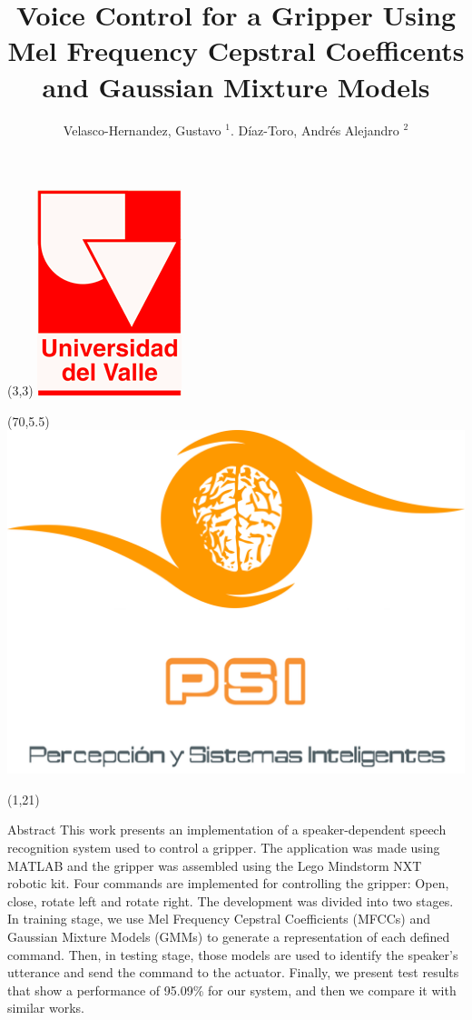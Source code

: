 \documentclass[final]{beamer}
\title{Voice Control for a Gripper Using Mel Frequency Cepstral Coefficents and Gaussian Mixture Models}
\author{Velasco-Hernandez, Gustavo $^{1}$. D\'{i}az-Toro, Andr\'{e}s Alejandro $^{2}$}
\institute{Perception and Intelligent Systems Research Group\\
	School of Electric and Electronics Engineering\\
	Universidad del Valle}
\date{}
\begin{document}
\begin{frame}{}

\begin{textblock}{5}(3,3)
\includegraphics[width=0.10\paperwidth]{figs/univalle.png}
\end{textblock}
\begin{textblock}{5}(70,5.5)
\includegraphics[width=0.15\paperwidth]{figs/psilogo3.png}
\end{textblock}


\begin{textblock}{39.5}(1,21)
\begin{block}{Abstract}
This work presents an implementation of a speaker-dependent speech recognition system used to control a gripper. The application was made using MATLAB and the gripper was assembled using the Lego Mindstorm NXT robotic kit. Four commands are implemented for controlling the gripper: Open, close, rotate left and rotate right. The development was divided into two stages. In training stage, we use Mel Frequency Cepstral Coefficients (MFCCs) and Gaussian Mixture Models (GMMs) to generate a representation of each defined command. Then, in testing stage, those models are used to identify the speaker’s utterance and send the command to the actuator. Finally, we present test results that show a performance of 95.09\% for our system, and then we compare it with similar works.
\end{block}


\end{textblock}
\end{frame}
\end{document}
